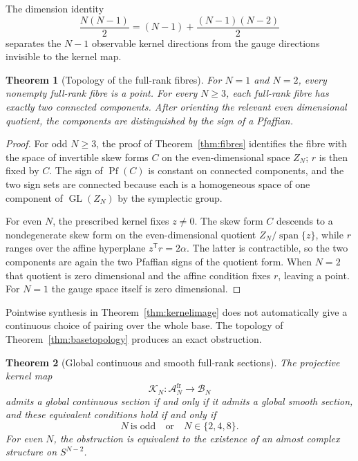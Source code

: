 \documentclass[11pt,a4paper]{article}
\newtheorem{theorem}{Theorem}[section]
\theoremstyle{definition}
\theoremstyle{remark}
\newcommand{\spanof}{\operatorname{span}}
\newcommand{\cA}{\mathcal{A}}
\newcommand{\cB}{\mathcal{B}}
\newcommand{\cK}{\mathcal{K}}
\begin{document}
The dimension identity
\[
 \frac{N(N-1)}2
 = (N-1)+\frac{(N-1)(N-2)}2
\]
separates the $N-1$ observable kernel directions from the gauge directions invisible to the
kernel map.

\begin{theorem}[Topology of the full-rank fibres]\label{thm:fibretopology}
For $N=1$ and $N=2$, every nonempty full-rank fibre is a point.  For every $N\geq3$, each
full-rank fibre has exactly two connected components.  After orienting the relevant even
dimensional quotient, the components are distinguished by the sign of a Pfaffian.
\end{theorem}

\begin{proof}
For odd $N\geq3$, the proof of Theorem~\ref{thm:fibres} identifies the fibre with the space
of invertible skew forms $C$ on the even-dimensional space $Z_N$; $r$ is then fixed by $C$.
The sign of $\operatorname{Pf}(C)$ is constant on connected components, and the two sign
sets are connected because each is a homogeneous space of one component of
$\operatorname{GL}(Z_N)$ by the symplectic group.

For even $N$, the prescribed kernel fixes $z\neq0$.  The skew form $C$ descends to a
nondegenerate skew form on the even-dimensional quotient
$Z_N/\spanof\{z\}$, while $r$ ranges over the affine hyperplane
$z^{\mathsf T}r=2\alpha$.  The latter is contractible, so the two components are again the
two Pfaffian signs of the quotient form.  When $N=2$ that quotient is zero dimensional and
the affine condition fixes $r$, leaving a point.  For $N=1$ the gauge space itself is zero
dimensional.
\end{proof}

Pointwise synthesis in Theorem~\ref{thm:kernelimage} does not automatically give a continuous
choice of pairing over the whole base.  The topology of Theorem~\ref{thm:basetopology}
produces an exact obstruction.

\begin{theorem}[Global continuous and smooth full-rank sections]
\label{thm:globalsmoothsection}
The projective kernel map
\begin{equation}\label{eq:sectionmap}
 \cK_N:\cA_N^{\mathrm{fr}}\longrightarrow\cB_N
\end{equation}
admits a global continuous section if and only if it admits a global smooth section, and
these equivalent conditions hold if and only if
\begin{equation}\label{eq:sectionorders}
 \boxed{N\ \text{is odd}\quad\text{or}\quad N\in\{2,4,8\}.}
\end{equation}
For even $N$, the obstruction is equivalent to the existence of an almost complex structure
on $S^{N-2}$.
\end{theorem}
\end{document}

